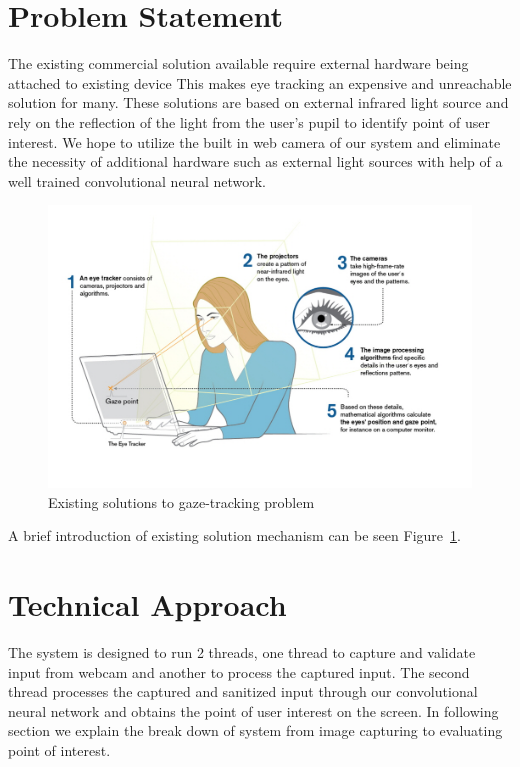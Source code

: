 \documentclass[10pt,twocolumn,letterpaper]{article}
\begin{document}
\section{Problem Statement}
The existing commercial solution available require external hardware
being attached to existing device\cite{eyetrackerlist}\cite{tobii_1} This makes eye tracking an
expensive and unreachable solution for many. These solutions are based
on external infrared light source and rely on the reflection of the
light from the user’s pupil to identify point of user interest. We hope to
utilize the built in web camera of our system and eliminate the necessity
of additional hardware such as external light sources with help of a
well trained convolutional neural network.

\begin{figure}
  \begin{center}
    \includegraphics[width=\linewidth]{existing_solutions}
  \end{center}
  \caption{Existing solutions to gaze-tracking problem}
  \label{fig:existsol}
  \end{figure}

A brief introduction of existing solution mechanism can be seen Figure~\ref{fig:existsol}.

\section{Technical Approach}
The system is designed to run 2 threads, one thread to capture 
and validate input from webcam and another to process the 
captured input. The second thread processes the captured and 
sanitized input through our convolutional neural network and 
obtains the point of user interest on the screen. In following section 
we explain the break down of system from image capturing 
to evaluating point of interest.  
\end{document}
